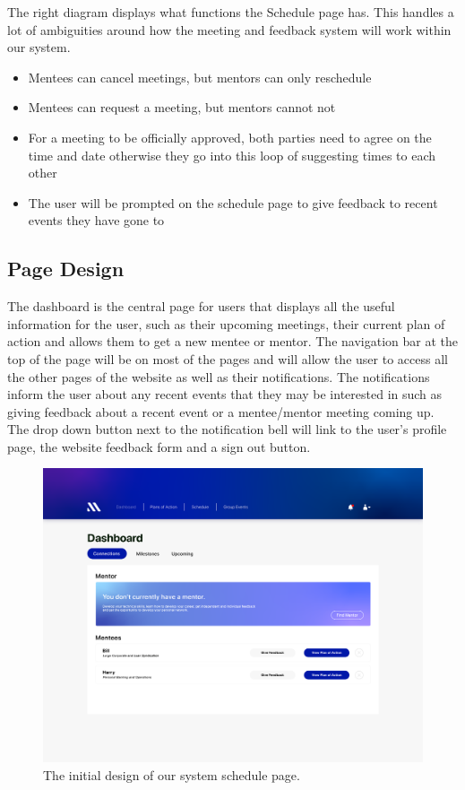 \documentclass[10pt]{article}
\begin{document}
The right diagram displays what functions the Schedule page has. This handles a
lot of ambiguities around how the meeting and feedback system will work within
our system.
\begin{itemize}[leftmargin=1.2cm,noitemsep,align=left]
    \item Mentees can cancel meetings, but mentors can only reschedule
    \item Mentees can request a meeting, but mentors cannot not
    \item For a meeting to be officially approved, both parties need to agree on the time and date otherwise they go into this loop of suggesting times to each other
    \item The user will be prompted on the schedule page to give feedback to recent events they have gone to
\end{itemize}

\pagebreak

\subsection{Page Design}

The dashboard is the central page for users that displays all the useful
information for the user, such as their upcoming meetings, their current plan of
action and allows them to get a new mentee or mentor. The navigation bar at the
top of the page will be on most of the pages and will allow the user to access
all the other pages of the website as well as their notifications. The
notifications inform the user about any recent events that they may be
interested in such as giving feedback about a recent event or a mentee/mentor
meeting coming up. The drop down button next to the notification bell will link
to the user's profile page, the website feedback form and a sign out button.

\begin{figure}[H]
    \centering
    \includegraphics[width=0.48 \textwidth]{Dashboard}
    \caption{The initial design of our system schedule page.}
    \label{fig:dashboard}
\end{figure}
\end{document}
